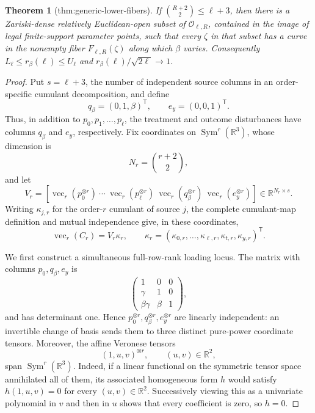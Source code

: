 \documentclass{article}
\newtheorem{theorem}{Theorem}
\begin{document}
\begin{theorem}[thm:generic-lower-fibers]\label{thm:generic-lower-fibers}
If \(\binom{R+2}{2}\le\ell+3\), then there is a Zariski-dense relatively Euclidean-open subset of \(\mathcal O_{\ell,R}\), contained in the image of legal finite-support parameter points, such that every \(\zeta\) in that subset has a curve in the nonempty fiber \(F_{\ell,R}(\zeta)\) along which \(\beta\) varies. Consequently \(L_{\ell}\le r_{\beta}(\ell)\le U_{\ell}\) and \(r_{\beta}(\ell)/\sqrt{2\ell}\to1\).
\end{theorem}
\begin{proof}
Put \(s=\ell+3\), the number of independent source columns in an order-specific cumulant decomposition, and define
\[
 q_\beta=(0,1,\beta)^{\mathsf T},\qquad e_y=(0,0,1)^{\mathsf T}.
\]
Thus, in addition to \(p_0,p_1,\ldots,p_\ell\), the treatment and outcome disturbances have columns \(q_\beta\) and \(e_y\), respectively.  Fix coordinates on \(\operatorname{Sym}^r(\mathbb R^3)\), whose dimension is
\[
 N_r=\binom{r+2}{2},
\]
and let
\[
 V_r=\left[\operatorname{vec}_r(p_0^{\otimes r})\ \cdots\ \operatorname{vec}_r(p_\ell^{\otimes r})\ \operatorname{vec}_r(q_\beta^{\otimes r})\ \operatorname{vec}_r(e_y^{\otimes r})\right]\in\mathbb R^{N_r\times s}.
\]
Writing \(\kappa_{j,r}\) for the order-\(r\) cumulant of source \(j\), the complete cumulant-map definition and mutual independence give, in these coordinates,
\[
 \operatorname{vec}_r(C_r)=V_r\kappa_r,
 \qquad
 \kappa_r=(\kappa_{0,r},\ldots,\kappa_{\ell,r},\kappa_{t,r},\kappa_{y,r})^{\mathsf T}.
 \tag{1}
\]

We first construct a simultaneous full-row-rank loading locus.  The matrix with columns \(p_0,q_\beta,e_y\) is
\[
 \begin{pmatrix}
 1&0&0\\
 \gamma&1&0\\
 \beta\gamma&\beta&1
 \end{pmatrix},
\]
and has determinant one.  Hence \(p_0^{\otimes r},q_\beta^{\otimes r},e_y^{\otimes r}\) are linearly independent: an invertible change of basis sends them to three distinct pure-power coordinate tensors.  Moreover, the affine Veronese tensors
\[
 (1,u,v)^{\otimes r},\qquad (u,v)\in\mathbb R^2,
\]
span \(\operatorname{Sym}^r(\mathbb R^3)\).  Indeed, if a linear functional on the symmetric tensor space annihilated all of them, its associated homogeneous form \(h\) would satisfy \(h(1,u,v)=0\) for every \((u,v)\in\mathbb R^2\).  Successively viewing this as a univariate polynomial in \(v\) and then in \(u\) shows that every coefficient is zero, so \(h=0\).


\end{proof}
\end{document}
